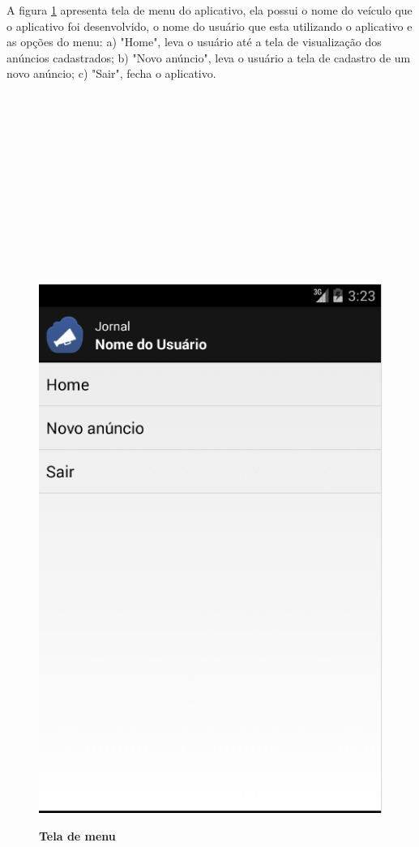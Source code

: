 \documentclass[
	12pt,				%
	openright,			%
	oneside,			%
	a4paper,			%
	chapter=TITLE,		%
	section=TITLE,		%
	english,			%
	french,				%
	spanish,			%
	brazil				%
	]{abntex2}
\begin{document}
A figura \ref{fig-android-menu} apresenta tela de menu do aplicativo, ela possui o nome do veículo que o aplicativo foi desenvolvido, o nome do usuário que esta utilizando o aplicativo e as opções do menu: a) "Home", leva o usuário até a tela de visualização dos anúncios cadastrados; b) "Novo anúncio", leva o usuário a tela de cadastro de um novo anúncio; c) "Sair", fecha o aplicativo. \\ \\ \\ \\ \\ \\ \\ \\ \\ \\ \\ \\ \\

\begin{figure}[h]
	\begin{center}
		\caption{
			\textbf{Tela de menu}
		}\label{fig-android-menu}
		\includegraphics [scale=0.6]{imagens/android-menu.png}
		\label{fig-android-menu}
	\end{center}
\end{figure}
\end{document}
